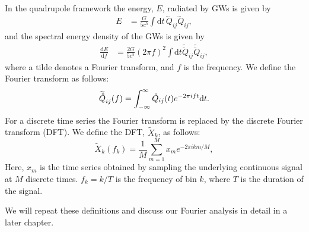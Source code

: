 In the quadrupole framework the energy, $E$, radiated by GWs is given by 
\begin{align}
E &=\frac{G}{5 c^5} \int \mathrm{d}t \, \dddot{Q}_{ij} \dddot{Q}_{ij},
\end{align}
and the spectral energy density of the GWs is given by 
\begin{align}
\frac{\mathrm{d} E}{\mathrm{d} f} &= \frac{2G}{5 c^5} (2\pi f)^2 \int \mathrm{d}t \widetilde{\ddot{Q}}_{ij} \widetilde{\ddot{Q}}_{ij},
\end{align}
where a tilde denotes a Fourier transform, and $f$ is the
frequency. We define the Fourier transform as follows:
\begin{equation}
\widetilde{\ddot{Q}}_{ij}(f) = \int_{-\infty}^{\infty} \ddot{Q}_{ij}(t) e^{-2 \pi i f t} \mathrm{d} t. 
\end{equation}
For a discrete time series the Fourier transform is replaced by the discrete Fourier transform (DFT).
We define the DFT, $\widetilde{X}_k$, as follows: 
\begin{equation} \label{eq:DFT}
\widetilde{X}_k (f_k) = \frac{1}{M}  \sum^M_{m=1} x_m e^{-2\pi i k m/M},
\end{equation}
Here, $x_m$ is the time series obtained by sampling the underlying continuous signal at $M$ discrete times. 
$f_k = k/T$ is the frequency of bin $k$, where $T$ is the duration of the signal.

We will repeat these definitions and discuss our Fourier analysis in detail in a later chapter. 
